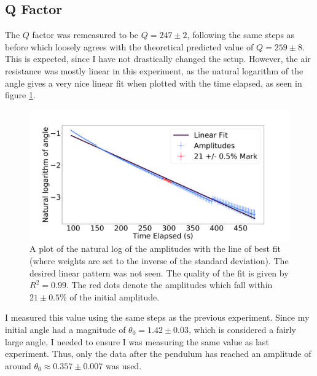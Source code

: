 \documentclass[%
 reprint,
 amsmath,amssymb
 aps,
]{revtex4-2}
\begin{document}
\subsection{Q Factor}
The $Q$ factor was remeasured to be $Q=247 \pm 2$, following the same steps as before which loosely agrees with the theoretical predicted value of $Q=259\pm 8$. This is expected, since I have not drastically changed the setup. However, the air resistance was mostly linear in this experiment, as the natural logarithm of the angle gives a very nice linear fit when plotted with the time elapsed, as seen in figure \ref{fig:amplitude-vs-time}.
\begin{figure}[!h]
    \includegraphics[width=\linewidth]{Figures/amplitude-vs-time-fitted.png}

    \caption{A plot of the natural log of the amplitudes with the line of best fit (where weights are set to the inverse of the standard deviation). The desired linear pattern was not seen. The quality of the fit is given by $R^2=0.99$. The red dots denote the amplitudes which fall within $21 \pm 0.5\%$ of the initial amplitude.}
    \label{fig:amplitude-vs-time}
\end{figure} 
I measured this value using the same steps as the previous experiment. Since my initial angle had a magnitude of $\theta_0=1.42 \pm 0.03$, which is considered a fairly large angle, I needed to ensure I was measuring the same value as last experiment. Thus, only the data after the pendulum has reached an amplitude of around $\theta_0\approx 0.357 \pm 0.007$ was used.
\end{document}

